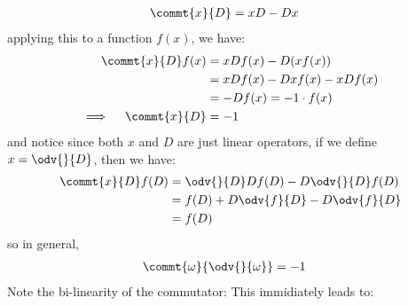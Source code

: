 \begin{align}
  \commt{x}{D} & = x D - D x
\end{align}
applying this to a function $f(x)$, we have:
\begin{align}
  \commt{x}{D} f(x)           & = x D f(x) - D (x f(x))          \\
                              & = x D f(x) - D x f(x) - x D f(x) \\
                              & = - D f(x) = - 1 \cdot f(x)      \\
  \implies \quad \commt{x}{D} & = -1
\end{align}
and notice since both $x$ and $D$ are just linear operators, if we define $x = \odv{}{D}$, then we have:
\begin{align}
  \commt{x}{D} f(D) & = \odv{}{D} D f(D) - D \odv{}{D} f(D) \\
                    & = f(D) + D \odv{f}{D} - D \odv{f}{D}  \\
                    & =  f(D)
\end{align}
so in general,
\begin{align}
  \commt{\omega}{\odv{}{\omega}} & = -1
\end{align}
Note the bi-linearity of the commutator:
This immidiately leads to:


